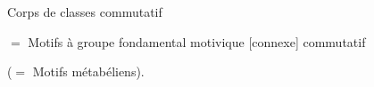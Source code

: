 Corps de classes commutatif

$=$ Motifs à groupe fondamental motivique [connexe] commutatif

($=$ Motifs métabéliens).

